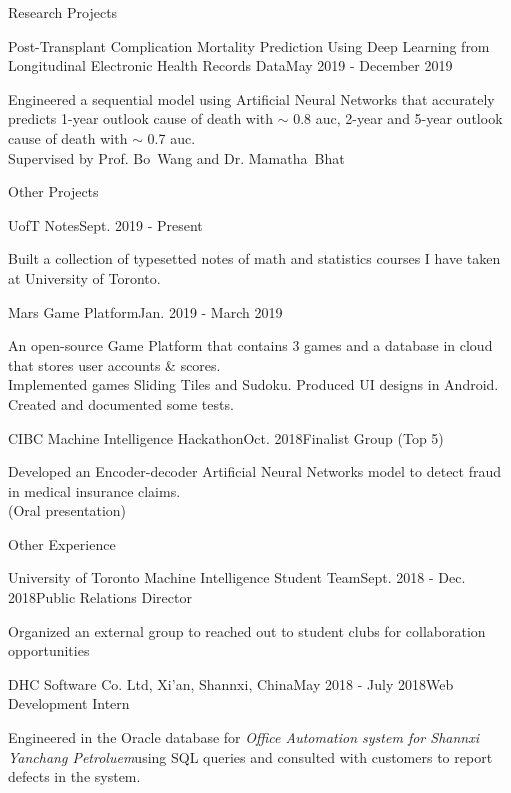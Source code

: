 \documentclass{resume} %
\begin{document}
\begin{rSection}{Research Projects}
	\begin{rSubsection}{Post-Transplant Complication Mortality Prediction Using Deep Learning from Longitudinal Electronic Health Records Data}{May 2019 - December 2019}{}{}
		\item
		Engineered a sequential model using Artificial Neural Networks that accurately predicts 1-year outlook cause of death with $\sim$ 0.8 auc, 2-year and 5-year outlook cause of death with $\sim$ 0.7 auc. \\
		Supervised by Prof. Bo~Wang and Dr. Mamatha~Bhat
	\end{rSubsection}
\end{rSection}

\begin{rSection}{Other Projects}
	\begin{rSubsection}{UofT Notes}{Sept. 2019 - Present}{}{}
		\item
		Built a collection of typesetted notes of math and statistics courses I have taken at University of Toronto.
	\end{rSubsection}

	\begin{rSubsection}{Mars Game Platform}{Jan. 2019 - March 2019}{}{}
		\item 
		An open-source Game Platform that contains 3 games and a database in cloud that stores user accounts \& scores.\\
		Implemented games Sliding Tiles and Sudoku. Produced UI designs in Android. Created and documented some tests.
	\end{rSubsection}
	\begin{rSubsection}{CIBC Machine Intelligence Hackathon}{Oct. 2018}{Finalist Group (Top 5)}{}
		\item 
		Developed an Encoder-decoder Artificial Neural Networks model to detect fraud in medical insurance claims.\\
		(Oral presentation)
	\end{rSubsection}
\end{rSection}

\begin{rSection}{Other Experience}
\begin{rSubsection}{University of Toronto Machine Intelligence Student Team}{Sept. 2018 - Dec. 2018}{Public Relations Director}{}
\item Organized an external group to reached out to student clubs for collaboration opportunities
\end{rSubsection}

\begin{rSubsection}{DHC Software Co. Ltd, Xi'an, Shannxi, China}{May 2018 - July 2018}{Web Development Intern}{}
	\item 
	Engineered in the Oracle database for \textit{Office Automation system for Shannxi Yanchang Petroluem}using SQL queries and consulted with customers to report defects in the system.
\end{rSubsection}

\end{rSection}
\end{document}

